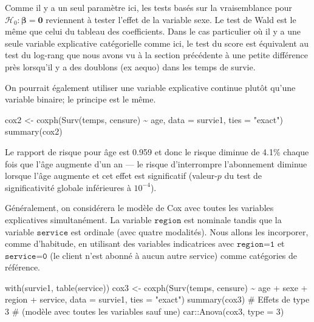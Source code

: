 \documentclass[
  11pt,
  letterpaper,
]{scrbook}
\newenvironment{Shaded}{\begin{snugshade}}{\end{snugshade}}
\newcommand{\AttributeTok}[1]{\textcolor[rgb]{0.40,0.45,0.13}{#1}}
\newcommand{\CommentTok}[1]{\textcolor[rgb]{0.37,0.37,0.37}{#1}}
\newcommand{\DecValTok}[1]{\textcolor[rgb]{0.68,0.00,0.00}{#1}}
\newcommand{\FunctionTok}[1]{\textcolor[rgb]{0.28,0.35,0.67}{#1}}
\newcommand{\NormalTok}[1]{\textcolor[rgb]{0.00,0.23,0.31}{#1}}
\newcommand{\OtherTok}[1]{\textcolor[rgb]{0.00,0.23,0.31}{#1}}
\newcommand{\SpecialCharTok}[1]{\textcolor[rgb]{0.37,0.37,0.37}{#1}}
\newcommand{\StringTok}[1]{\textcolor[rgb]{0.13,0.47,0.30}{#1}}
\theoremstyle{definition}
\theoremstyle{remark}
\begin{document}
Comme il y a un seul paramètre ici, les tests basés sur la vraisemblance
pour \(\mathscr{H}_0: \boldsymbol{\beta}=\boldsymbol{0}\) reviennent à
tester l'effet de la variable sexe. Le test de Wald est le même que
celui du tableau des coefficients. Dans le cas particulier où il y a une
seule variable explicative catégorielle comme ici, le test du score est
équivalent au test du log-rang que nous avons vu à la section précédente
à une petite différence près lorsqu'il y a des doublons (ex aequo) dans
les temps de survie.

On pourrait également utiliser une variable explicative continue plutôt
qu'une variable binaire; le principe est le même.

\begin{Shaded}
\begin{Highlighting}[]
\NormalTok{cox2 }\OtherTok{\textless{}{-}} \FunctionTok{coxph}\NormalTok{(}\FunctionTok{Surv}\NormalTok{(temps, censure) }\SpecialCharTok{\textasciitilde{}}\NormalTok{ age, }
              \AttributeTok{data =}\NormalTok{ survie1,}
              \AttributeTok{ties =} \StringTok{"exact"}\NormalTok{)}
\FunctionTok{summary}\NormalTok{(cox2)}
\end{Highlighting}
\end{Shaded}

Le rapport de risque pour âge est 0.959 et donc le risque diminue de
4.1\% chaque fois que l'âge augmente d'un an --- le risque d'interrompre
l'abonnement diminue lorsque l'âge augmente et cet effet est
significatif (valeur-\(p\) du test de significativité globale
inférieures à \(10^{-4}\)).

Généralement, on considérera le modèle de Cox avec toutes les variables
explicatives simultanément. La variable \(\texttt{region}\) est nominale
tandis que la variable \(\texttt{service}\) est ordinale (avec quatre
modalités). Nous allons les incorporer, comme d'habitude, en utilisant
des variables indicatrices avec \(\texttt{region=1}\) et
\(\texttt{service=0}\) (le client n'est abonné à aucun autre service)
comme catégories de référence.

\begin{Shaded}
\begin{Highlighting}[]
\FunctionTok{with}\NormalTok{(survie1, }\FunctionTok{table}\NormalTok{(service))}
\NormalTok{cox3 }\OtherTok{\textless{}{-}} \FunctionTok{coxph}\NormalTok{(}\FunctionTok{Surv}\NormalTok{(temps, censure) }\SpecialCharTok{\textasciitilde{}} 
\NormalTok{                age }\SpecialCharTok{+}\NormalTok{ sexe }\SpecialCharTok{+}\NormalTok{ region }\SpecialCharTok{+}\NormalTok{ service, }
              \AttributeTok{data =}\NormalTok{ survie1, }
              \AttributeTok{ties =} \StringTok{"exact"}\NormalTok{)}
\FunctionTok{summary}\NormalTok{(cox3)}
\CommentTok{\# Effets de type 3 }
\CommentTok{\# (modèle avec toutes les variables sauf une)}
\NormalTok{car}\SpecialCharTok{::}\FunctionTok{Anova}\NormalTok{(cox3, }
           \AttributeTok{type =} \DecValTok{3}\NormalTok{)}
\end{Highlighting}
\end{Shaded}
\end{document}
